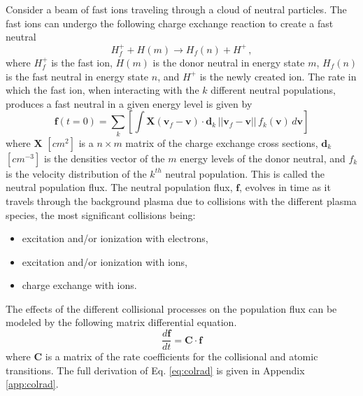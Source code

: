 Consider a beam of fast ions traveling through a cloud of neutral particles. The fast ions can undergo the following charge exchange reaction to create a fast neutral
\begin{equation}
    H_f^+ + H(m) \rightarrow H_f(n) + H^+\,,
\end{equation}
where $H_f^+$ is the fast ion, $H(m)$ is the donor neutral in energy state $m$, $H_f(n)$ is the fast neutral in energy state $n$, and $H^+$ is the newly created ion.
The rate in which the fast ion, when interacting with the $k$ different neutral populations, produces a fast neutral in a given energy level is given by
\begin{equation}\label{eq:cx_rates}
    \mathbf{f}(t=0) = \sum_k \left [ \int \mathbf{X}(\mathbf{v}_f - \mathbf{v}) \cdot \mathbf{d}_k\, ||\mathbf{v}_f - \mathbf{v}||\, f_k(\mathbf{v})\, d\mathbf{v} \right ]
\end{equation}
where $\mathbf{X}$ $[cm^2]$ is a $n \times m$ matrix of the charge exchange cross sections, $\mathbf{d}_k$ $[cm^{-3}]$ is the densities vector of the $m$ energy levels of the donor neutral, and $f_k$ is the velocity distribution of the $k^{th}$ neutral population. This is called the neutral population flux.
The neutral population flux, $\mathbf{f}$, evolves in time as it travels through the background plasma due to collisions with the different plasma species, the most significant collisions being:
\begin{itemize}
    \item excitation and/or ionization with electrons,
    \item excitation and/or ionization with ions,
    \item charge exchange with ions.
\end{itemize}

The effects of the different collisional processes on the population flux can be modeled by the following matrix differential equation. 
\begin{equation}\label{eq:colrad}
    \frac{d \mathbf{f}}{dt} = \mathbf{C} \cdot \mathbf{f}
\end{equation}
where $\mathbf{C}$ is a matrix of the rate coefficients for the collisional and atomic transitions.
The full derivation of Eq. \ref{eq:colrad} is given in Appendix \ref{app:colrad}.

